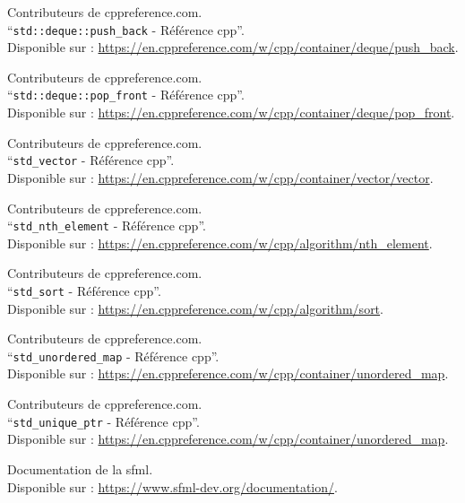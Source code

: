 \documentclass[a4paper,12pt]{report}
\begin{document}
\begin{thebibliography}{9}
        Contributeurs de cppreference.com. \\
        ``\texttt{std::\gls{deque}::push\_back} - Référence \gls{cpp}''. \\
        Disponible sur : \url{https://en.cppreference.com/w/cpp/container/deque/push_back}.

        Contributeurs de cppreference.com.\\
        ``\texttt{std::\gls{deque}::pop\_front} - Référence \gls{cpp}''.\\
        Disponible sur : \url{https://en.cppreference.com/w/cpp/container/deque/pop_front}.

        Contributeurs de cppreference.com.\\
        ``\texttt{\gls{std_vector}} - Référence \gls{cpp}''.\\
        Disponible sur : \url{https://en.cppreference.com/w/cpp/container/vector/vector}.

        Contributeurs de cppreference.com.\\
        ``\texttt{\gls{std_nth_element}} - Référence \gls{cpp}''.\\
        Disponible sur : \url{https://en.cppreference.com/w/cpp/algorithm/nth_element}.

        Contributeurs de cppreference.com.\\
        ``\texttt{\gls{std_sort}} - Référence \gls{cpp}''.\\
        Disponible sur : \url{https://en.cppreference.com/w/cpp/algorithm/sort}.

        Contributeurs de cppreference.com.\\
        ``\texttt{\gls{std_unordered_map}} - Référence \gls{cpp}''.\\
        Disponible sur : \url{https://en.cppreference.com/w/cpp/container/unordered_map}.

        Contributeurs de cppreference.com.\\
        ``\texttt{\gls{std_unique_ptr}} - Référence \gls{cpp}''.\\
        Disponible sur : \url{https://en.cppreference.com/w/cpp/container/unordered_map}.

        Documentation de la \gls{sfml}. \\
        Disponible sur : \url{https://www.sfml-dev.org/documentation/}.


\end{thebibliography}
\end{document}
